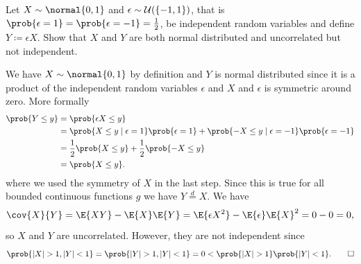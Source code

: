 
\begin{exercise}[subtitle={Uncorrelated but not independent normal \Coffeecup}]
    \label{ex: uncorrelated but not independent normal}
    Let \(X \sim \normal{0,1}\) and \(\epsilon \sim \mathcal{U}(\{-1,1\})\), that is \(\prob{\epsilon = 1} = \prob{\epsilon = -1} = \frac{1}{2}\), be independent
    random variables and define
    \(Y \coloneq \epsilon X\).
    Show that \(X\) and \(Y\) are both normal distributed and uncorrelated but not independent.
\end{exercise}

\begin{solution}
    We have \(X \sim \normal{0,1}\) by definition and \(Y\) is normal
    distributed since it is a product of the independent random variables
    \(\epsilon\) and \(X\) and \(\epsilon\) is
    symmetric around zero. More formally
    \[\begin{aligned}
        \prob{Y \le y}
        &= \prob{\epsilon X \le y}
        \\
        &= \prob{X \le y \mid \epsilon = 1} \prob{\epsilon = 1} + \prob{-X \le y \mid \epsilon = -1} \prob{\epsilon = -1}
        \\
        &= \frac{1}{2} \prob{X \le y} + \frac{1}{2} \prob{-X \le y} 
        \\
        &= \prob{X \le y}.
    \end{aligned}\]
    where we used the symmetry of \(X\) in the last step. Since this is true for all bounded continuous functions \(g\) we have \(Y \overset{d}= X\).
    We have
    \[
        \cov{X}{Y}
        = \E{XY} - \E{X}\E{Y}
        = \E{\epsilon X^2} - \E{\epsilon}\E{X}^2
        = 0 - 0 = 0,
    \]
    so \(X\) and \(Y\) are uncorrelated.
    However, they are not independent since
    \[
        \prob{\abs{X} > 1, \abs{Y} < 1}
        = \prob{\abs{Y} >1, \abs{Y} < 1} = 0
        < \prob{\abs{X} > 1}\prob{\abs{Y} < 1}.
        \qedhere
    \]
\end{solution}
